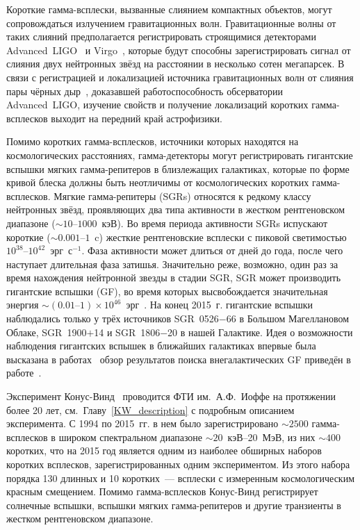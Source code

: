 Короткие гамма-всплески, вызванные слиянием компактных объектов, могут сопровождаться излучением гравитационных волн. 
Гравитационные волны от таких слияний предполагается регистрировать строящимися 
детекторами Advanced~LIGO~\citep{Harry_2010CQGra} и Virgo~\citep{Accadia_2012JInst}, 
которые будут способны зарегистрировать сигнал от слияния
двух нейтронных звёзд на расстоянии в несколько сотен мегапарсек. 
В связи с регистрацией и локализацией источника гравитационных
волн от слияния пары чёрных дыр~\citep{Abbott_2016PhRvL}, доказавшей работоспособность обсерватории 
Advanced~LIGO, изучение свойств и получение локализаций коротких гамма-всплесков 
выходит на передний край астрофизики.

Помимо коротких гамма-всплесков, источники которых находятся на космологических расстояниях,
гамма-детекторы могут регистрировать гигантские вспышки мягких гамма-репитеров 
в близлежащих галактиках, которые по форме кривой блеска должны быть неотличимы от 
космологических коротких гамма-всплесков. Мягкие гамма-репитеры (SGRs) относятся 
к редкому классу нейтронных звёзд, проявляющих 
два типа активности в жестком рентгеновском диапазоне ($\sim 10\textrm{--}1000$~кэВ). 
Во время периода активности SGRs испускают короткие ($\sim0.001\textrm{--}1$~c) жесткие рентгеновские всплески 
с пиковой светимостью $10^{38}\textrm{--}10^{42}$~эрг~с$^{-1}$. Фаза активности может длиться 
от дней до года, после чего наступает длительная фаза затишья. Значительно реже, 
возможно, один раз за время нахождения нейтронной звезды в стадии SGR, SGR может 
производить гигантские вспышки (GF), во время которых высвобождается значительная 
энергия $\sim(0.01\textrm{--}1)\times 10^{46}$~эрг~\citep[см. обзор][]{Mereghetti2013}.
На конец 2015~г. гигантские вспышки наблюдались только у трёх источников 
SGR~0526$-$66 в Большом Магеллановом Облаке, SGR~1900$+$14 и SGR~1806$-$20 в нашей Галактике.
Идея о возможности наблюдения гигантских вспышек в ближайших галактиках впервые была высказана 
в работах~\citep{Mazets1981,Mazets1982} обзор результатов поиска 
внегалактических GF приведён в работе~\citep{Hurley2011}.

Эксперимент Конус-Винд~\citep{Aptekar_1995SSR} проводится ФТИ им.~А.Ф.~Иоффе на протяжении более 20 лет, 
см.~Главу~\ref{KW_description} с подробным описанием эксперимента.
С 1994 по 2015~гг. в нем  было зарегистрировано 
$\sim 2500$ гамма-всплесков в широком спектральном диапазоне $\sim 20$~кэВ--20~МэВ,
из них $\sim 400$ коротких, что на 2015 год является 
одним из наиболее обширных наборов коротких всплесков, зарегистрированных 
одним экспериментом. Из этого набора порядка 130 длинных и 10 коротких~--- всплески 
с измеренным космологическим красным смещением. 
Помимо гамма-всплесков Конус-Винд регистрирует солнечные вспышки, вспышки мягких гамма-репитеров 
и другие транзиенты в жестком рентгеновском диапазоне.

